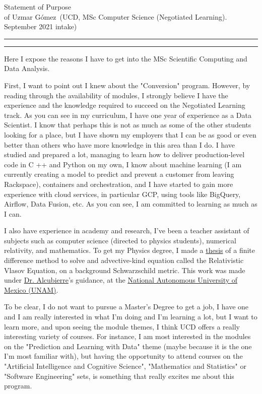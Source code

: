 \documentclass{article}
\newcommand{\soptitle}{Statement of Purpose}
\newcommand{\yourname}{Uzmar G\'omez}
\begin{document}
\begin{center}\LARGE\soptitle\\
\large of \yourname\ (UCD, MSc Computer Science (Negotiated Learning). September 2021 intake)
\end{center}

\hrule
\vspace{1pt}
\hrule height 1pt

\bigskip

Here I expose the reasons I have to get into the MSc Scientific Computing and Data Analysis.

First, I want to point out I knew about the "Conversion" program. However, by reading through the availability of modules, I strongly believe I have the experience and the knowledge required to succeed on the Negotiated Learning track. As you can see in my curriculum,  I have one year of experience as a Data Scientist. I know that perhaps this is not as much as some of the other students looking for a place, but I have shown my employers that I can be as good or even better than others who have more knowledge in this area than I do. I have studied and prepared a lot, managing to learn how to deliver production-level code in C ++ and Python on my own, I know about machine learning (I am currently creating a model to predict and prevent a customer from leaving Rackspace), containers and orchestration, and I have started to gain more experience with cloud services, in particular GCP, using tools like BigQuery, Airflow, Data Fusion, etc. As you can see, I am committed to learning as much as I can.

I also have experience in academy and research, I've been a teacher assistant of subjects such as computer science (directed to physics students), numerical relativity, and mathematics. To get my Physics degree, I made a \href{http://oreon.dgbiblio.unam.mx/F/YF3LAD8UIUFR2XRPDE3H6JM2MI44M8RY8QX1RH7K429163KKEV-19694?func=find-b&request=uzmar&find_code=WRD&adjacent=N&local_base=TES01&x=65&y=13&filter_code_2=WYR&filter_request_2=&filter_code_3=WYR&filter_request_3=}{thesis} of a finite difference method to solve and advective-kind equation called the Relativistic Vlasov Equation, on a background Schwarzschild metric. This work was made under \href{https://sigi.nucleares.unam.mx/sgiicn/people/user/view/id/8}{Dr. Alcubierre}'s guidance, at the \href{https://www.unam.mx/}{National Autonomous University of Mexico (UNAM)}.

To be clear, I do not want to pursue a Master's Degree to get a job, I have one and I am really interested in what I'm doing and I'm learning a lot, but I want to learn more, and upon seeing the module themes, I think UCD offers a really interesting variety of courses. For instance, I am most interested in the modules on the "Prediction and Learning with Data" theme (maybe because it is the one I'm most familiar with), but having the opportunity to attend courses on the "Artificial Intelligence and Cognitive Science", "Mathematics and Statistics" or "Software Engineering" sets, is something that really excites me about this program.
\end{document}
